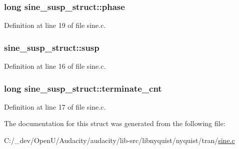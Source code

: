 \subsubsection[{\texorpdfstring{phase}{phase}}]{\setlength{\rightskip}{0pt plus 5cm}long sine\+\_\+susp\+\_\+struct\+::phase}\hypertarget{structsine__susp__struct_aa6d104c552e89347a6e62f55550fb8df}{}\label{structsine__susp__struct_aa6d104c552e89347a6e62f55550fb8df}


Definition at line 19 of file sine.\+c.

\subsubsection[{\texorpdfstring{susp}{susp}}]{ sine\+\_\+susp\+\_\+struct\+::susp}\hypertarget{structsine__susp__struct_a8777e5359c52e2518dfaae655c5c2bc4}{}\label{structsine__susp__struct_a8777e5359c52e2518dfaae655c5c2bc4}


Definition at line 16 of file sine.\+c.

\subsubsection[{\texorpdfstring{terminate\+\_\+cnt}{terminate_cnt}}]{\setlength{\rightskip}{0pt plus 5cm}long sine\+\_\+susp\+\_\+struct\+::terminate\+\_\+cnt}\hypertarget{structsine__susp__struct_a17bb208fec738e21d949b1d0d2ab9b5b}{}\label{structsine__susp__struct_a17bb208fec738e21d949b1d0d2ab9b5b}


Definition at line 17 of file sine.\+c.



The documentation for this struct was generated from the following file\+:\begin{DoxyCompactItemize}
\item 
C\+:/\+\_\+dev/\+Open\+U/\+Audacity/audacity/lib-\/src/libnyquist/nyquist/tran/\hyperlink{sine_8c}{sine.\+c}\end{DoxyCompactItemize}
